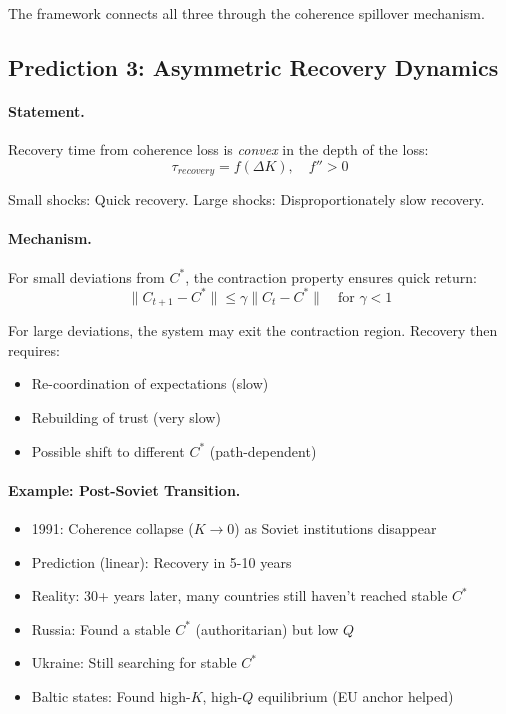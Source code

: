 \documentclass[12pt,a4paper]{article}
\begin{document}
The framework connects all three through the coherence spillover mechanism.

\subsection{Prediction 3: Asymmetric Recovery Dynamics}

\paragraph{Statement.}
Recovery time from coherence loss is \emph{convex} in the depth of the loss:
\begin{equation}
  \tau_{recovery} = f(\Delta K), \quad f'' > 0
\end{equation}

Small shocks: Quick recovery.
Large shocks: Disproportionately slow recovery.

\paragraph{Mechanism.}
For small deviations from $C^*$, the contraction property ensures quick return:
\begin{equation}
  \|C_{t+1} - C^*\| \leq \gamma \|C_t - C^*\| \quad \text{for } \gamma < 1
\end{equation}

For large deviations, the system may exit the contraction region.
Recovery then requires:
\begin{itemize}
  \item Re-coordination of expectations (slow)
  \item Rebuilding of trust (very slow)
  \item Possible shift to different $C^*$ (path-dependent)
\end{itemize}

\paragraph{Example: Post-Soviet Transition.}
\begin{itemize}
  \item 1991: Coherence collapse ($K \to 0$) as Soviet institutions disappear
  \item Prediction (linear): Recovery in 5-10 years
  \item Reality: 30+ years later, many countries still haven't reached stable $C^*$
  \item Russia: Found a stable $C^*$ (authoritarian) but low $Q$
  \item Ukraine: Still searching for stable $C^*$
  \item Baltic states: Found high-$K$, high-$Q$ equilibrium (EU anchor helped)
\end{itemize}
\end{document}
